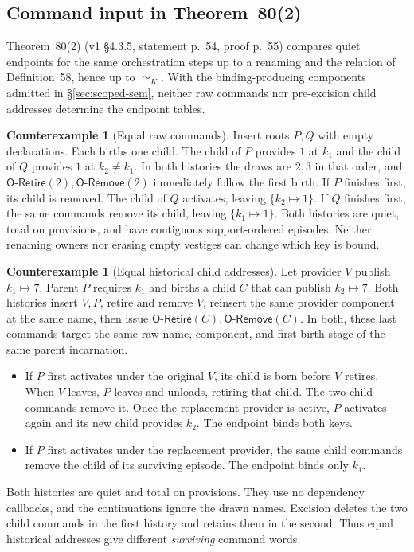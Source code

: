 \documentclass[11pt,a4paper]{article}
\theoremstyle{definition}
\newtheorem{counterexample}[definition]{Counterexample}
\theoremstyle{plain}
\newcommand{\ORetire}{\mathsf{O\text{-}Retire}}
\newcommand{\ORemove}{\mathsf{O\text{-}Remove}}
\begin{document}
\subsection{Command input in Theorem~80(2)}
\label{sec:t80-2}

Theorem~80(2) (v1 \S4.3.5, statement p.~54, proof p.~55) compares quiet endpoints for the same orchestration steps up to a renaming and the relation of Definition~58, hence up to $\simeq_K$. With the binding-producing components admitted in \S\ref{sec:scoped-sem}, neither raw commands nor pre-excision child addresses determine the endpoint tables.

\begin{counterexample}[Equal raw commands]
Insert roots $P,Q$ with empty declarations. Each births one child. The child of $P$ provides $1$ at $k_1$ and the child of $Q$ provides $1$ at $k_2\ne k_1$. In both histories the draws are $2,3$ in that order, and $\ORetire(2),\ORemove(2)$ immediately follow the first birth.
If $P$ finishes first, its child is removed. The child of $Q$ activates, leaving $\{k_2\mapsto1\}$. If $Q$ finishes first, the same commands remove its child, leaving $\{k_1\mapsto1\}$. Both histories are quiet, total on provisions, and have contiguous support-ordered episodes. Neither renaming owners nor erasing empty vestiges can change which key is bound.
\end{counterexample}

\begin{counterexample}[Equal historical child addresses]
Let provider $V$ publish $k_1\mapsto7$. Parent $P$ requires $k_1$ and births a child $C$ that can publish $k_2\mapsto7$. Both histories insert $V,P$, retire and remove $V$, reinsert the same provider component at the same name, then issue $\ORetire(C),\ORemove(C)$. In both, these last commands target the same raw name, component, and first birth stage of the same parent incarnation.
\begin{itemize}
\item If $P$ first activates under the original $V$, its child is born before $V$ retires. When $V$ leaves, $P$ leaves and unloads, retiring that child. The two child commands remove it. Once the replacement provider is active, $P$ activates again and its new child provides $k_2$. The endpoint binds both keys.
\item If $P$ first activates under the replacement provider, the same child commands remove the child of its surviving episode. The endpoint binds only $k_1$.
\end{itemize}
Both histories are quiet and total on provisions. They use no dependency callbacks, and the continuations ignore the drawn names. Excision deletes the two child commands in the first history and retains them in the second. Thus equal historical addresses give different \emph{surviving} command words.
\end{counterexample}
\end{document}
